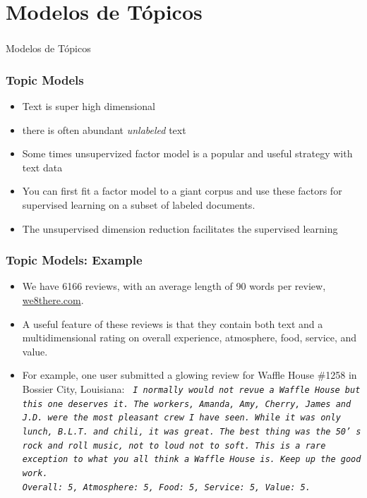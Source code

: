 \documentclass[
  shownotes,
  xcolor={svgnames},
  hyperref={colorlinks,citecolor=DarkBlue,linkcolor=DarkRed,urlcolor=DarkBlue}
  , aspectratio=169]{beamer}
\begin{document}
\section{Modelos de Tópicos}
\begin{frame}[fragile]
\frametitle{}


\centering
{\huge \textcolor{andesred}{Modelos de Tópicos}}


\end{frame}

\begin{frame}
\frametitle{Topic Models}

\begin{itemize}
\item Text is super high dimensional
\medskip
\item there is often abundant {\it unlabeled} text
\medskip
\item Some times unsupervized factor model is a popular and useful strategy with text data
\medskip
\item You can first fit a factor model to a giant corpus and use these factors for supervised learning on a subset of labeled documents.
\medskip
\item The unsupervised dimension reduction facilitates the supervised learning
\end{itemize}
\end{frame}
\begin{frame}
\frametitle{Topic Models: Example}

\begin{itemize}


\item We have 6166 reviews, with an average length of 90 words per review, \url{we8there.com}. 
\medskip
\item A useful feature of these reviews is that they contain both text and a multidimensional rating on overall experience, atmosphere, food, service, and value. 
\medskip
\item For example, one user submitted a glowing review for Waffle House \#1258 in Bossier City, Louisiana: 
\medskip
{\tt \it 
I normally would not revue a Waffle House but this one deserves it. The workers, Amanda, Amy, Cherry, James and J.D. were the most pleasant crew I have seen. While it was only lunch, B.L.T. and chili, it was great. The best thing was the 50’ s rock and roll music, not to loud not to soft. This is a rare exception to what you all think a Waffle House is. Keep up the good work. \\
Overall: 5, Atmosphere: 5, Food: 5, Service: 5, Value: 5. 
}
\end{itemize}
\end{frame}
\end{document}
